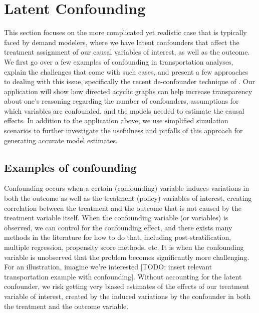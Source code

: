 \section{Latent Confounding}
\label{sec:latent-confounding}

This section focuses on the more complicated yet realistic case that is 
typically faced by demand modelers, where we have latent confounders that 
affect the treatment assignment of our causal variables of interest, as well as the outcome. 
We first go over a few examples of confounding in transportation analyses, explain 
the challenges that come with such cases, and present a few approaches to 
dealing with this issue, specifically the recent de-confounder technique of 
\citet{wang_2019_blessings}. 
Our application will show how directed acyclic graphs can 
help increase transparency about one's reasoning regarding the number of 
confounders, assumptions for which variables are confounded, and the models 
needed to estimate the causal effects. 
In addition to the application above, we use simplified simulation scenarios to further investigate the usefulness 
and pitfalls of this approach for generating accurate model estimates. 


\subsection{Examples of confounding}
\label{sec:confounding-examples}

Confounding occurs when a certain (confounding) variable induces variations in
both the outcome as well as the treatment (policy) variables of interest, 
creating correlation between the treatment and the outcome that is not caused
by the treatment variable itself. When the confounding variable (or variables) is 
observed, we can control for the confounding effect, and there exists many 
methods in the literature for how to do that, including post-stratification,
multiple regression, propensity score methods, etc. It is when the 
confounding variable is unobserved that the problem becomes significantly 
more challenging. For an illustration, imagine we're interested [TODO: 
insert relevant transportation example with confounding]. Without 
accounting for the latent confounder, we risk getting very biased estimates 
of the effects of our treatment variable of interest, created by the 
induced variations by the confounder in both the treatment and the outcome 
variable. 



